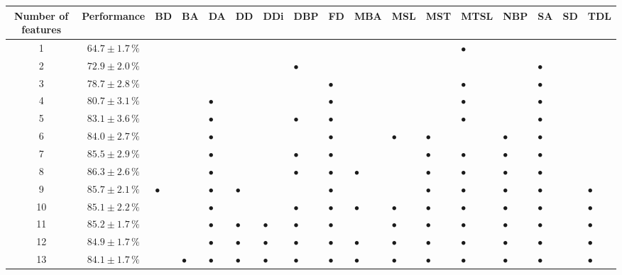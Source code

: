 \documentclass[11pt]{article}
\begin{document}
\begin{sidewaystable}
\begin{tabular}{cclllllllllllllll}
\toprule
Number of features & Performance  & BD & BA & DA & DD & DDi & DBP & FD & MBA & MSL & MST & MTSL & NBP & SA & SD & TDL\\
\midrule
1 & $64.7 \pm 1.7\,\%$  &  &  &  &  &  &  &  &  &  &  & $\bullet$ &  &  &  & \\
2 & $72.9 \pm 2.0\,\%$  &  &  &  &  &  & $\bullet$ &  &  &  &  &  &  & $\bullet$ &  & \\
3 & $78.7 \pm 2.8\,\%$  &  &  &  &  &  &  & $\bullet$ &  &  &  & $\bullet$ &  & $\bullet$ &  & \\
4 & $80.7 \pm 3.1\,\%$  &  &  & $\bullet$ &  &  &  & $\bullet$ &  &  &  & $\bullet$ &  & $\bullet$ &  & \\
5 & $83.1 \pm 3.6\,\%$  &  &  & $\bullet$ &  &  & $\bullet$ & $\bullet$ &  &  &  & $\bullet$ &  & $\bullet$ &  & \\
6 & $84.0 \pm 2.7\,\%$  &  &  & $\bullet$ &  &  &  & $\bullet$ &  & $\bullet$ & $\bullet$ &  & $\bullet$ & $\bullet$ &  & \\
7 & $85.5 \pm 2.9\,\%$  &  &  & $\bullet$ &  &  & $\bullet$ & $\bullet$ &  &  & $\bullet$ & $\bullet$ & $\bullet$ & $\bullet$ &  & \\
8 & $86.3 \pm 2.6\,\%$  &  &  & $\bullet$ &  &  & $\bullet$ & $\bullet$ & $\bullet$ &  & $\bullet$ & $\bullet$ & $\bullet$ & $\bullet$ &  & \\
9 & $85.7 \pm 2.1\,\%$  & $\bullet$ &  & $\bullet$ & $\bullet$ &  &  & $\bullet$ &  &  & $\bullet$ & $\bullet$ & $\bullet$ & $\bullet$ &  & $\bullet$\\
10 & $85.1 \pm 2.2\,\%$  &  &  & $\bullet$ &  &  & $\bullet$ & $\bullet$ & $\bullet$ & $\bullet$ & $\bullet$ & $\bullet$ & $\bullet$ & $\bullet$ &  & $\bullet$\\
11 & $85.2 \pm 1.7\,\%$  &  &  & $\bullet$ & $\bullet$ & $\bullet$ & $\bullet$ & $\bullet$ &  & $\bullet$ & $\bullet$ & $\bullet$ & $\bullet$ & $\bullet$ &  & $\bullet$\\
12 & $84.9 \pm 1.7\,\%$  &  &  & $\bullet$ & $\bullet$ & $\bullet$ & $\bullet$ & $\bullet$ & $\bullet$ & $\bullet$ & $\bullet$ & $\bullet$ & $\bullet$ & $\bullet$ &  & $\bullet$\\
13 & $84.1 \pm 1.7\,\%$  &  & $\bullet$ & $\bullet$ & $\bullet$ & $\bullet$ & $\bullet$ & $\bullet$ & $\bullet$ & $\bullet$ & $\bullet$ & $\bullet$ & $\bullet$ & $\bullet$ &  & $\bullet$\\

\end{tabular}
\end{sidewaystable}
\end{document}
